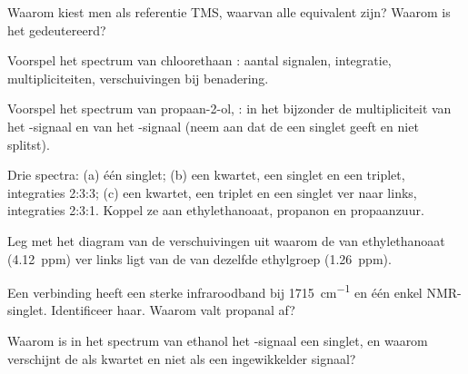 \begin{exercise}[$\star$]\label{exo:g12:proton-nmr:5}
Waarom kiest men als referentie TMS, waarvan alle  equivalent
zijn? Waarom is het  gedeutereerd?
\end{exercise}

\begin{exercise}[$\star\star$]\label{exo:g12:proton-nmr:6}
Voorspel het spectrum van chloorethaan : aantal signalen,
integratie, multipliciteiten, verschuivingen bij benadering.
\end{exercise}

\begin{exercise}[$\star\star$]\label{exo:g12:proton-nmr:7}
Voorspel het spectrum van propaan-2-ol, : in het
bijzonder de multipliciteit van het -signaal en van het
-signaal (neem aan dat de  een singlet geeft en niet
splitst).
\end{exercise}

\begin{exercise}[$\star\star$]\label{exo:g12:proton-nmr:8}
Drie spectra: (a) één singlet; (b) een kwartet, een singlet en een
triplet, integraties 2:3:3; (c) een kwartet, een triplet en een singlet
ver naar links, integraties 2:3:1. Koppel ze aan ethylethanoaat, propanon
en propaanzuur.
\end{exercise}

\begin{exercise}[$\star\star$]\label{exo:g12:proton-nmr:9}
Leg met het diagram van de verschuivingen uit waarom de  van
ethylethanoaat (\qty{4.12}{ppm}) ver links ligt van de  van
dezelfde ethylgroep (\qty{1.26}{ppm}).
\end{exercise}

\begin{exercise}[$\star\star$]\label{exo:g12:proton-nmr:10}
Een verbinding  heeft een sterke infraroodband bij
\qty{1715}{cm^{-1}} en één enkel NMR-singlet. Identificeer haar. Waarom
valt propanal af?
\end{exercise}

\begin{exercise}[$\star\star$]\label{exo:g12:proton-nmr:11}
Waarom is in het spectrum van ethanol het -signaal een singlet, en
waarom verschijnt de  als kwartet en niet als een ingewikkelder
signaal?
\end{exercise}

